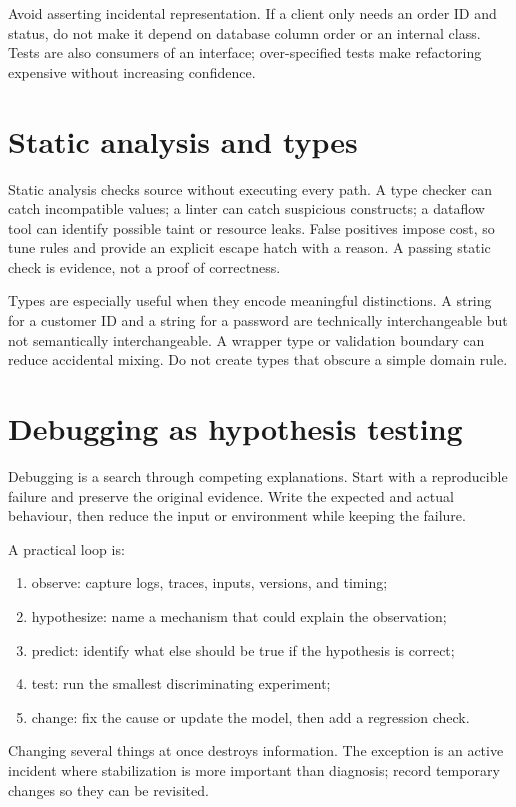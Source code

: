 Avoid asserting incidental representation. If a client only needs an order ID
and status, do not make it depend on database column order or an internal class.
Tests are also consumers of an interface; over-specified tests make refactoring
expensive without increasing confidence.

\section{Static analysis and types}
Static analysis checks source without executing every path. A type checker can
catch incompatible values; a linter can catch suspicious constructs; a dataflow
tool can identify possible taint or resource leaks. False positives impose cost,
so tune rules and provide an explicit escape hatch with a reason. A passing
static check is evidence, not a proof of correctness.

Types are especially useful when they encode meaningful distinctions. A string
for a customer ID and a string for a password are technically interchangeable but
not semantically interchangeable. A wrapper type or validation boundary can
reduce accidental mixing. Do not create types that obscure a simple domain rule.

\section{Debugging as hypothesis testing}
Debugging is a search through competing explanations. Start with a reproducible
failure and preserve the original evidence. Write the expected and actual
behaviour, then reduce the input or environment while keeping the failure.

A practical loop is:

\begin{enumerate}
  \item observe: capture logs, traces, inputs, versions, and timing;
  \item hypothesize: name a mechanism that could explain the observation;
  \item predict: identify what else should be true if the hypothesis is correct;
  \item test: run the smallest discriminating experiment;
  \item change: fix the cause or update the model, then add a regression check.
\end{enumerate}

Changing several things at once destroys information. The exception is an active
incident where stabilization is more important than diagnosis; record temporary
changes so they can be revisited.

